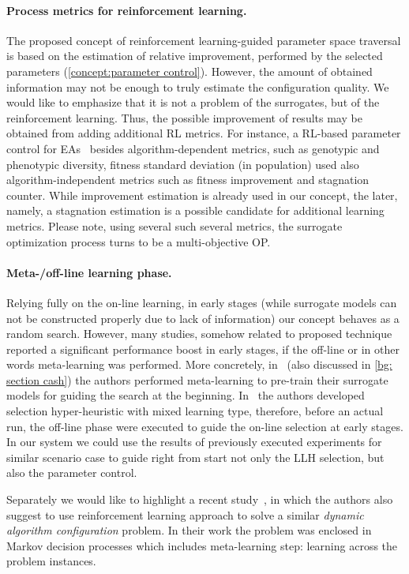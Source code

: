 \paragraph{Process metrics for reinforcement learning.} The proposed concept of reinforcement learning-guided parameter space traversal is based on the estimation of relative improvement, performed by the selected parameters (\cref{concept:parameter control}). However, the amount of obtained information may not be enough to truly estimate the configuration quality. We would like to emphasize that it is not a problem of the surrogates, but of the reinforcement learning. Thus, the possible improvement of results may be obtained from adding additional RL metrics. For instance, a RL-based parameter control for EAs~\cite{karafotias2014generic} besides algorithm-dependent metrics, such as genotypic and phenotypic diversity, fitness standard deviation (in population) used also algorithm-independent metrics such as fitness improvement and stagnation counter. While improvement estimation is already used in our concept, the later, namely, a stagnation estimation is a possible candidate for additional learning metrics. Please note, using several such several metrics, the surrogate optimization process turns to be a multi-objective OP.


\paragraph{Meta-/off-line learning phase.} Relying fully on the on-line learning, in early stages (while surrogate models can not be constructed properly due to lack of information) our concept behaves as a random search. However, many studies, somehow related to proposed technique reported a significant performance boost in early stages, if the off-line or in other words meta-learning was performed. More concretely, in~\cite{feurer2015efficient} (also discussed in \cref{bg: section cash}) the authors performed meta-learning to pre-train their surrogate models for guiding the search at the beginning. In~\cite{uludaug2013hybrid} the authors developed selection hyper-heuristic with mixed learning type, therefore, before an actual run, the off-line phase were executed to guide the on-line selection at early stages. In our system we could use the results of previously executed experiments for similar scenario case to guide right from start not only the LLH selection, but also the parameter control. 

Separately we would like to highlight a recent study~\cite{biedenkapp-ecai20}, in which the authors also suggest to use reinforcement learning approach to solve a similar \emph{dynamic algorithm configuration} problem. In their work the problem was enclosed in Markov decision processes which includes meta-learning step: learning across the problem instances.


